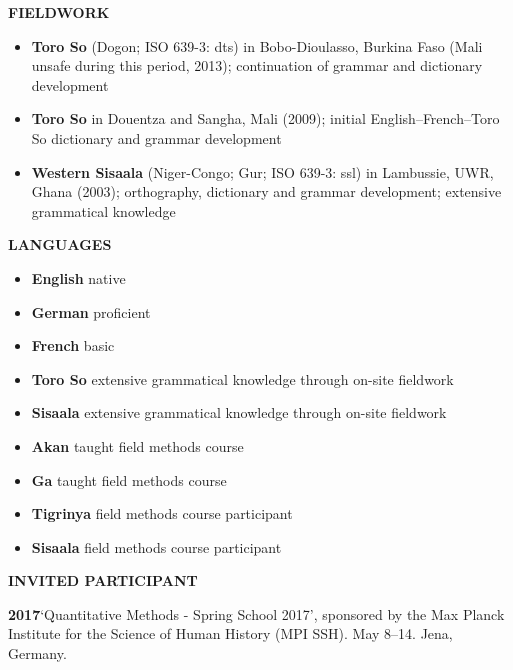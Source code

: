 \documentclass[11pt]{article}
\newcommand{\hangpara}{
 \setlength{\parindent}{0in} %
 \hangindent=0.42in %
}
\begin{document}
\vskip 10pt
\begin{flushleft}
{\bf FIELDWORK}
\end{flushleft}
\begin{itemize}
\item {\bf Toro So} (Dogon; ISO 639-3: dts) in Bobo-Dioulasso, Burkina Faso (Mali unsafe during this period, 2013); continuation of grammar and dictionary development
\item {\bf Toro So} in Douentza and Sangha, Mali (2009); initial English--French--Toro So dictionary and grammar development
\item {\bf Western Sisaala} (Niger-Congo; Gur; ISO 639-3: ssl) in Lambussie, UWR, Ghana (2003); orthography, dictionary and grammar development; extensive grammatical knowledge
\end{itemize}

\vskip 10pt
\begin{flushleft}
{\bf LANGUAGES}
\end{flushleft}
\begin{itemize}
\item {\bf English} native
\item {\bf German} proficient
\item {\bf French} basic
\item {\bf Toro So} extensive grammatical knowledge through on-site fieldwork
\item {\bf Sisaala} extensive grammatical knowledge through on-site fieldwork
\item {\bf Akan} taught field methods course
\item {\bf Ga} taught field methods course
\item {\bf Tigrinya} field methods course participant
\item {\bf Sisaala} field methods course participant
\end{itemize}


\vskip 10pt
\begin{flushleft}
{\bf INVITED PARTICIPANT}
\end{flushleft}

\hangpara
{\bf 2017}\hspace{1ex}`Quantitative Methods - Spring School 2017', sponsored by the Max Planck Institute for the Science of Human History (MPI SSH). May 8--14. Jena, Germany.
\end{document}
